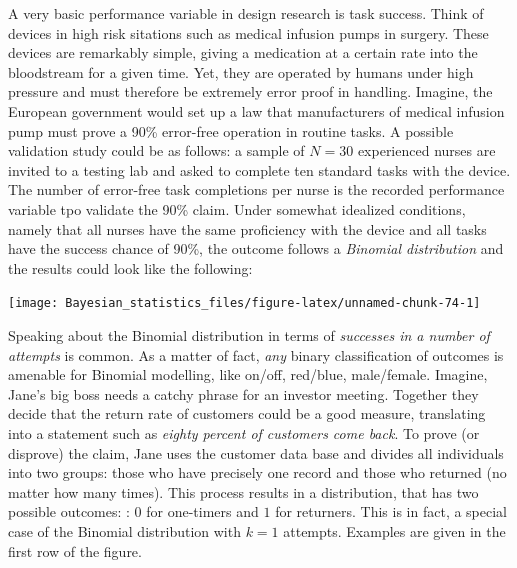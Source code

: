\documentclass[]{svmono}
\newenvironment{Shaded}{\begin{snugshade}}{\end{snugshade}}
\newcommand{\KeywordTok}[1]{\textcolor[rgb]{0.13,0.29,0.53}{\textbf{#1}}}
\newcommand{\DataTypeTok}[1]{\textcolor[rgb]{0.13,0.29,0.53}{#1}}
\newcommand{\DecValTok}[1]{\textcolor[rgb]{0.00,0.00,0.81}{#1}}
\newcommand{\StringTok}[1]{\textcolor[rgb]{0.31,0.60,0.02}{#1}}
\newcommand{\OperatorTok}[1]{\textcolor[rgb]{0.81,0.36,0.00}{\textbf{#1}}}
\newcommand{\NormalTok}[1]{#1}
\begin{document}
A very basic performance variable in design research is task success.
Think of devices in high risk sitations such as medical infusion pumps
in surgery. These devices are remarkably simple, giving a medication at
a certain rate into the bloodstream for a given time. Yet, they are
operated by humans under high pressure and must therefore be extremely
error proof in handling. Imagine, the European government would set up a
law that manufacturers of medical infusion pump must prove a 90\%
error-free operation in routine tasks. A possible validation study could
be as follows: a sample of \(N = 30\) experienced nurses are invited to
a testing lab and asked to complete ten standard tasks with the device.
The number of error-free task completions per nurse is the recorded
performance variable tpo validate the 90\% claim. Under somewhat
idealized conditions, namely that all nurses have the same proficiency
with the device and all tasks have the success chance of 90\%, the
outcome follows a \emph{Binomial distribution} and the results could
look like the following:

\begin{Shaded}
\end{Shaded}

\texttt{[image: Bayesian\_statistics\_files/figure-latex/unnamed-chunk-74-1]}

Speaking about the Binomial distribution in terms of \emph{successes in
a number of attempts} is common. As a matter of fact, \emph{any} binary
classification of outcomes is amenable for Binomial modelling, like
on/off, red/blue, male/female. Imagine, Jane's big boss needs a catchy
phrase for an investor meeting. Together they decide that the return
rate of customers could be a good measure, translating into a statement
such as \emph{eighty percent of customers come back}. To prove (or
disprove) the claim, Jane uses the customer data base and divides all
individuals into two groups: those who have precisely one record and
those who returned (no matter how many times). This process results in a
distribution, that has two possible outcomes: : \(0\) for one-timers and
\(1\) for returners. This is in fact, a special case of the Binomial
distribution with \(k = 1\) attempts. Examples are given in the first
row of the figure.
\end{document}
